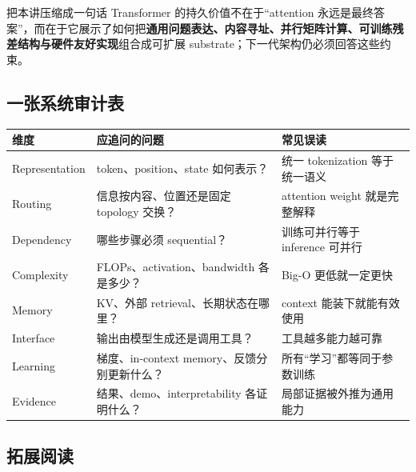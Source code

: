 \begin{importantbox}{把本讲压缩成一句话}
Transformer 的持久价值不在于“attention 永远是最终答案”，而在于它展示了如何把\textbf{通用问题表达、内容寻址、并行矩阵计算、可训练残差结构与硬件友好实现}组合成可扩展 substrate；下一代架构仍必须回答这些约束。
\end{importantbox}

\subsection{一张系统审计表}

\begin{longtable}{@{}L{0.18\textwidth}L{0.35\textwidth}L{0.35\textwidth}@{}}
\toprule
维度 & 应追问的问题 & 常见误读 \\
\midrule
Representation & token、position、state 如何表示？ & 统一 tokenization 等于统一语义 \\
Routing & 信息按内容、位置还是固定 topology 交换？ & attention weight 就是完整解释 \\
Dependency & 哪些步骤必须 sequential？ & 训练可并行等于 inference 可并行 \\
Complexity & FLOPs、activation、bandwidth 各是多少？ & Big-O 更低就一定更快 \\
Memory & KV、外部 retrieval、长期状态在哪里？ & context 能装下就能有效使用 \\
Interface & 输出由模型生成还是调用工具？ & 工具越多能力越可靠 \\
Learning & 梯度、in-context memory、反馈分别更新什么？ & 所有“学习”都等同于参数训练 \\
Evidence & 结果、demo、interpretability 各证明什么？ & 局部证据被外推为通用能力 \\
\bottomrule
\end{longtable}

\subsection{拓展阅读}

